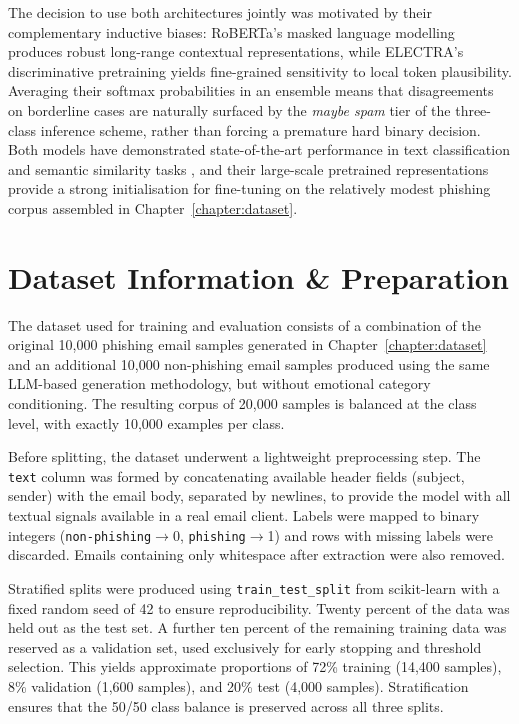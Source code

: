 The decision to use both architectures jointly was motivated by their complementary inductive biases: RoBERTa's masked language modelling produces robust long-range contextual representations, while ELECTRA's discriminative pretraining yields fine-grained sensitivity to local token plausibility. Averaging their softmax probabilities in an ensemble means that disagreements on borderline cases are naturally surfaced by the \textit{maybe spam} tier of the three-class inference scheme, rather than forcing a premature hard binary decision. Both models have demonstrated state-of-the-art performance in text classification and semantic similarity tasks \cite{liu2019roberta, sanh2019distilbert}, and their large-scale pretrained representations provide a strong initialisation for fine-tuning on the relatively modest phishing corpus assembled in Chapter~\ref{chapter:dataset}.

\section{Dataset Information \& Preparation}
The dataset used for training and evaluation consists of a combination of the original 10,000 phishing email samples generated in Chapter~\ref{chapter:dataset} and an additional 10,000 non-phishing email samples produced using the same LLM-based generation methodology, but without emotional category conditioning. The resulting corpus of 20,000 samples is balanced at the class level, with exactly 10,000 examples per class.

Before splitting, the dataset underwent a lightweight preprocessing step. The \texttt{text} column was formed by concatenating available header fields (subject, sender) with the email body, separated by newlines, to provide the model with all textual signals available in a real email client. Labels were mapped to binary integers (\texttt{non-phishing}$\to$0, \texttt{phishing}$\to$1) and rows with missing labels were discarded. Emails containing only whitespace after extraction were also removed.

Stratified splits were produced using \texttt{train\_test\_split} from scikit-learn \cite{pedregosa2011scikit} with a fixed random seed of 42 to ensure reproducibility. Twenty percent of the data was held out as the test set. A further ten percent of the remaining training data was reserved as a validation set, used exclusively for early stopping and threshold selection. This yields approximate proportions of 72\% training (14,400 samples), 8\% validation (1,600 samples), and 20\% test (4,000 samples). Stratification ensures that the 50/50 class balance is preserved across all three splits.

